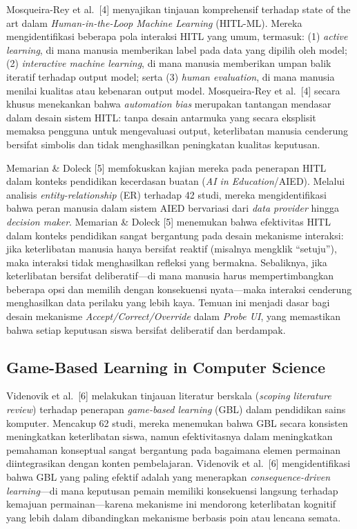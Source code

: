 \documentclass[10pt,twoside,openright]{report}
\begin{document}
Mosqueira-Rey et al.\ [4] menyajikan tinjauan komprehensif terhadap state of the art dalam \textit{Human-in-the-Loop Machine Learning} (HITL-ML). Mereka mengidentifikasi beberapa pola interaksi HITL yang umum, termasuk: (1) \textit{active learning}, di mana manusia memberikan label pada data yang dipilih oleh model; (2) \textit{interactive machine learning}, di mana manusia memberikan umpan balik iteratif terhadap output model; serta (3) \textit{human evaluation}, di mana manusia menilai kualitas atau kebenaran output model. Mosqueira-Rey et al.\ [4] secara khusus menekankan bahwa \textit{automation bias} merupakan tantangan mendasar dalam desain sistem HITL: tanpa desain antarmuka yang secara eksplisit memaksa pengguna untuk mengevaluasi output, keterlibatan manusia cenderung bersifat simbolis dan tidak menghasilkan peningkatan kualitas keputusan.

Memarian \& Doleck [5] memfokuskan kajian mereka pada penerapan HITL dalam konteks pendidikan kecerdasan buatan (\textit{AI in Education}/AIED). Melalui analisis \textit{entity-relationship} (ER) terhadap 42 studi, mereka mengidentifikasi bahwa peran manusia dalam sistem AIED bervariasi dari \textit{data provider} hingga \textit{decision maker}. Memarian \& Doleck [5] menemukan bahwa efektivitas HITL dalam konteks pendidikan sangat bergantung pada desain mekanisme interaksi: jika keterlibatan manusia hanya bersifat reaktif (misalnya mengklik ``setuju''), maka interaksi tidak menghasilkan refleksi yang bermakna. Sebaliknya, jika keterlibatan bersifat deliberatif---di mana manusia harus mempertimbangkan beberapa opsi dan memilih dengan konsekuensi nyata---maka interaksi cenderung menghasilkan data perilaku yang lebih kaya. Temuan ini menjadi dasar bagi desain mekanisme \textit{Accept/Correct/Override} dalam \textit{Probe UI}, yang memastikan bahwa setiap keputusan siswa bersifat deliberatif dan berdampak.

\subsection{Game-Based Learning in Computer Science}
\label{subsec:penelitian-gbl-cs}

Videnovik et al.\ [6] melakukan tinjauan literatur berskala (\textit{scoping literature review}) terhadap penerapan \textit{game-based learning} (GBL) dalam pendidikan sains komputer. Mencakup 62 studi, mereka menemukan bahwa GBL secara konsisten meningkatkan keterlibatan siswa, namun efektivitasnya dalam meningkatkan pemahaman konseptual sangat bergantung pada bagaimana elemen permainan diintegrasikan dengan konten pembelajaran. Videnovik et al.\ [6] mengidentifikasi bahwa GBL yang paling efektif adalah yang menerapkan \textit{consequence-driven learning}---di mana keputusan pemain memiliki konsekuensi langsung terhadap kemajuan permainan---karena mekanisme ini mendorong keterlibatan kognitif yang lebih dalam dibandingkan mekanisme berbasis poin atau lencana semata.
\end{document}
